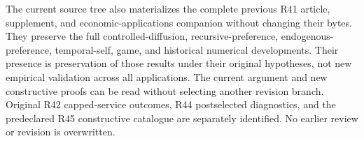 \documentclass[ecta,nameyear,draft]{econsocart}
\begin{document}
The current source tree also materializes the complete previous R41 article, supplement, and economic-applications companion without changing their bytes. They preserve the full controlled-diffusion, recursive-preference, endogenous-preference, temporal-self, game, and historical numerical developments. Their presence is preservation of those results under their original hypotheses, not new empirical validation across all applications. The current argument and new constructive proofs can be read without selecting another revision branch. Original R42 capped-service outcomes, R44 postselected diagnostics, and the predeclared R45 constructive catalogue are separately identified. No earlier review or revision is overwritten.



\end{document}
